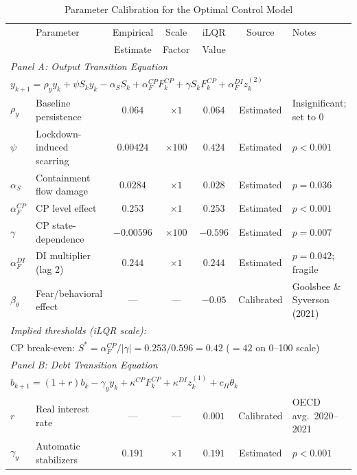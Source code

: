 \begin{table}[htbp]
\centering
\caption{Parameter Calibration for the Optimal Control Model}
\label{tab:calibration}
\small
\begin{tabular}{llccccl}
\toprule
 & Parameter & Empirical & Scale & iLQR & Source & Notes \\
 &           & Estimate  & Factor & Value &        &       \\
\midrule
\multicolumn{7}{l}{\textit{Panel A: Output Transition Equation}} \\
\multicolumn{7}{l}{$y_{k+1} = \rho_y y_k + \psi S_k y_k - \alpha_S S_k + \alpha_F^{CP} F_k^{CP} + \gamma S_k F_k^{CP} + \alpha_F^{DI} z_k^{(2)}$} \\[6pt]
$\rho_y$         & Baseline persistence     & $0.064$   & $\times 1$   & $0.064$  & Estimated & Insignificant; set to $0$ \\
$\psi$           & Lockdown-induced scarring & $0.00424$ & $\times 100$ & $0.424$  & Estimated & $p < 0.001$ \\
$\alpha_S$       & Containment flow damage   & $0.0284$  & $\times 1$   & $0.028$  & Estimated & $p = 0.036$ \\
$\alpha_F^{CP}$  & CP level effect           & $0.253$   & $\times 1$   & $0.253$  & Estimated & $p < 0.001$ \\
$\gamma$         & CP state-dependence       & $-0.00596$& $\times 100$ & $-0.596$ & Estimated & $p = 0.007$ \\
$\alpha_F^{DI}$  & DI multiplier (lag 2)     & $0.244$   & $\times 1$   & $0.244$  & Estimated & $p = 0.042$; fragile \\
$\beta_\theta$   & Fear/behavioral effect    & ---       & ---          & $-0.05$  & Calibrated & Goolsbee \& Syverson (2021) \\[6pt]
\multicolumn{7}{l}{\textit{Implied thresholds (iLQR scale):}} \\
\multicolumn{7}{l}{\quad CP break-even: $S^* = \alpha_F^{CP}/|\gamma| = 0.253/0.596 = 0.42$ \quad ($= 42$ on 0--100 scale)} \\[6pt]
\midrule
\multicolumn{7}{l}{\textit{Panel B: Debt Transition Equation}} \\
\multicolumn{7}{l}{$b_{k+1} = (1+r)b_k - \gamma_y y_k + \kappa^{CP} F_k^{CP} + \kappa^{DI} z_k^{(1)} + c_H \theta_k$} \\[6pt]
$r$              & Real interest rate        & ---       & ---          & $0.001$  & Calibrated & OECD avg.\ 2020--2021 \\
$\gamma_y$       & Automatic stabilizers     & $0.191$   & $\times 1$   & $0.191$  & Estimated & $p < 0.001$ \\

\end{tabular}
\end{table}
